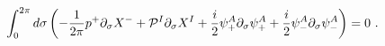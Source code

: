 \begin{equation}
\int^{2\pi}_0 d \sigma
 \left( - \frac{1}{2\pi} p^+ \partial_\sigma X^-
   + {\cal P}^I \partial_\sigma X^I
   + \frac{i}{2} \psi^A_+ \partial_\sigma \psi^A_+
   + \frac{i}{2} \psi^A_- \partial_\sigma \psi^A_-
 \right) = 0 ~.
\end{equation}

